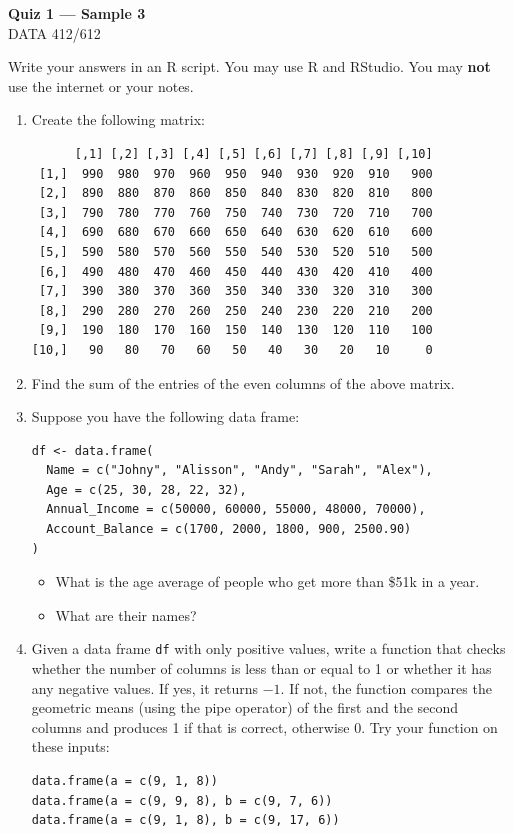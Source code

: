 \documentclass[11pt]{article}
\begin{document}
\begin{center}
{\LARGE\bfseries Quiz 1 --- Sample 3}\\[0.35em]
DATA 412/612
\end{center}

\vspace{0.4em}

Write your answers in an R script. You may use R and RStudio.
You may \textbf{not} use the internet or your notes.

\begin{enumerate}
\item Create the following matrix:
\begin{lstlisting}
      [,1] [,2] [,3] [,4] [,5] [,6] [,7] [,8] [,9] [,10]
 [1,]  990  980  970  960  950  940  930  920  910   900
 [2,]  890  880  870  860  850  840  830  820  810   800
 [3,]  790  780  770  760  750  740  730  720  710   700
 [4,]  690  680  670  660  650  640  630  620  610   600
 [5,]  590  580  570  560  550  540  530  520  510   500
 [6,]  490  480  470  460  450  440  430  420  410   400
 [7,]  390  380  370  360  350  340  330  320  310   300
 [8,]  290  280  270  260  250  240  230  220  210   200
 [9,]  190  180  170  160  150  140  130  120  110   100
[10,]   90   80   70   60   50   40   30   20   10     0
\end{lstlisting}

\item Find the sum of the entries of the even columns of the above matrix.

\item Suppose you have the following data frame:
\begin{lstlisting}
df <- data.frame(
  Name = c("Johny", "Alisson", "Andy", "Sarah", "Alex"),
  Age = c(25, 30, 28, 22, 32),
  Annual_Income = c(50000, 60000, 55000, 48000, 70000),
  Account_Balance = c(1700, 2000, 1800, 900, 2500.90)
)
\end{lstlisting}
\begin{itemize}
  \item What is the age average of people who get more than \$51k in a year.
  \item What are their names?
\end{itemize}

\item Given a data frame \texttt{df} with only positive values, write a function
that checks whether the number of columns is less than or equal to 1 or whether
it has any negative values. If yes, it returns $-1$. If not, the function
compares the geometric means (using the pipe operator) of the first and the
second columns and produces 1 if that is correct, otherwise 0. Try your
function on these inputs:
\begin{lstlisting}
data.frame(a = c(9, 1, 8))
data.frame(a = c(9, 9, 8), b = c(9, 7, 6))
data.frame(a = c(9, 1, 8), b = c(9, 17, 6))
\end{lstlisting}
\end{enumerate}
\end{document}

